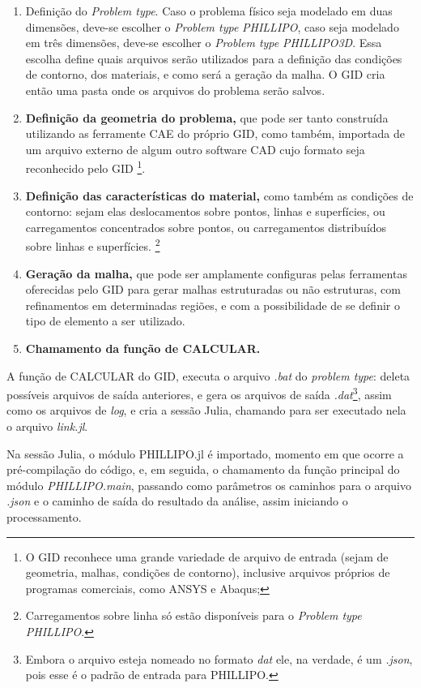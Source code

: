 \begin{enumerate}
    \item Definição do \emph{Problem type}. Caso o problema físico seja modelado em duas dimensões, deve-se escolher o \emph{Problem type} \emph{PHILLIPO}, caso seja modelado em três dimensões, deve-se escolher o \emph{Problem type} \emph{PHILLIPO3D}. Essa escolha define quais arquivos serão utilizados para a definição das condições de contorno, dos materiais, e como será a geração da malha. O GID cria então uma pasta onde os arquivos do problema serão salvos.

    \item \textbf{Definição da geometria do problema,} que pode ser tanto construída utilizando as ferramente CAE do próprio GID, como também, importada de um arquivo externo de algum outro software CAD cujo formato seja reconhecido pelo GID \footnote{O GID reconhece uma grande variedade de arquivo de entrada (sejam de geometria, malhas, condições de contorno), inclusive arquivos próprios de programas comerciais, como ANSYS e Abaqus;}.

    \item \textbf{Definição das características do material,} como também as condições de contorno: sejam elas deslocamentos sobre pontos, linhas e superfícies, ou carregamentos concentrados sobre pontos, ou carregamentos distribuídos sobre linhas e superfícies. \footnote{Carregamentos sobre linha só estão disponíveis para o \emph{Problem type} \emph{PHILLIPO}.}

    \item \textbf{Geração da malha,} que pode ser amplamente configuras pelas ferramentas oferecidas pelo GID para gerar malhas estruturadas ou não estruturas, com refinamentos em determinadas regiões, e com a possibilidade de se definir o tipo de elemento a ser utilizado. 
    \item \textbf{Chamamento da função de CALCULAR.}
\end{enumerate}

A função de CALCULAR do GID, executa o arquivo \emph{.bat} do \emph{problem type}: deleta possíveis arquivos de saída anteriores, e gera os arquivos de saída \emph{.dat}\footnote{Embora o arquivo esteja nomeado no formato \emph{dat} ele, na verdade, é um \emph{.json}, pois esse é o padrão de entrada para PHILLIPO.}, assim como os arquivos de \emph{log}, e cria a sessão Julia, chamando para ser executado nela o arquivo \emph{link.jl}. 

Na sessão Julia, o módulo PHILLIPO.jl é importado, momento em que ocorre a pré-compilação do código, e, em seguida, o chamamento da função principal do módulo \emph{PHILLIPO.main}, passando como parâmetros os caminhos para o arquivo \emph{.json} e o caminho de saída do resultado da análise, assim iniciando o processamento.

